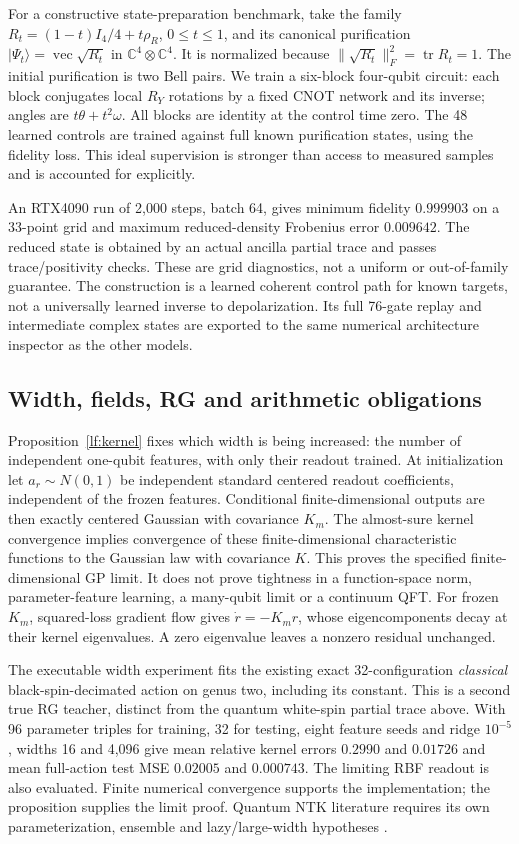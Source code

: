 \documentclass[11pt,oneside,openany]{book}
\theoremstyle{definition}\newtheorem{definition}[theorem]{Definition}
\theoremstyle{remark}\newtheorem{remark}[theorem]{Remark}
\begin{document}
For a constructive state-preparation benchmark, take the family
$R_t=(1-t)I_4/4+t\rho_R$, $0\leq t\leq1$, and its canonical purification
$|\Psi_t\rangle=\operatorname{vec}\sqrt{R_t}$ in
$\mathbb C^4\otimes\mathbb C^4$. It is normalized because
$\|\sqrt{R_t}\|_F^2=\operatorname{tr}R_t=1$.
The initial purification is two Bell pairs. We train a six-block four-qubit
circuit: each block conjugates local $R_Y$ rotations by a fixed CNOT network
and its inverse; angles are $t\theta+t^2\omega$. All blocks are identity at
the control time zero. The 48 learned controls are trained against full
known purification states, using the fidelity loss. This ideal supervision
is stronger than access to measured samples and is accounted for explicitly.

An RTX4090 run of 2,000 steps, batch 64, gives minimum fidelity $0.999903$
on a 33-point grid and maximum reduced-density Frobenius error $0.009642$.
The reduced state is obtained by an actual ancilla partial trace and passes
trace/positivity checks. These are grid diagnostics, not a uniform or
out-of-family guarantee. The construction is a learned coherent control
path for known targets, not a universally learned inverse to depolarization.
Its full 76-gate replay and intermediate complex states are exported to the
same numerical architecture inspector as the other models.

\subsection{Width, fields, RG and arithmetic obligations}
Proposition~\ref{lf:kernel} fixes which width is being increased: the number
of independent one-qubit features, with only their readout trained.
At initialization let $a_r\sim N(0,1)$ be independent standard centered
readout coefficients, independent of the frozen features. Conditional
finite-dimensional outputs are then exactly centered Gaussian with
covariance $K_m$. The almost-sure kernel
convergence implies convergence of these finite-dimensional characteristic
functions to the Gaussian law with covariance $K$. This proves the specified
finite-dimensional GP limit. It does not prove tightness in a function-space
norm, parameter-feature learning, a many-qubit limit or a continuum QFT.
For frozen $K_m$, squared-loss gradient flow gives
$\dot r=-K_mr$, whose eigencomponents decay at their kernel eigenvalues.
A zero eigenvalue leaves a nonzero residual unchanged.

The executable width experiment fits the existing exact 32-configuration
\emph{classical} black-spin-decimated action on genus two, including its
constant. This is a second true RG teacher, distinct from the quantum
white-spin partial trace above. With 96 parameter triples for training,
32 for testing, eight feature seeds and ridge $10^{-5}$, widths 16 and
4,096 give mean relative kernel errors $0.2990$ and $0.01726$ and mean
full-action test MSE $0.02005$ and $0.000743$. The limiting RBF readout is
also evaluated. Finite numerical convergence supports the implementation;
the proposition supplies the limit proof. Quantum NTK literature requires
its own parameterization, ensemble and lazy/large-width hypotheses
\cite{LFQNTK,LFNTK}.
\end{document}
